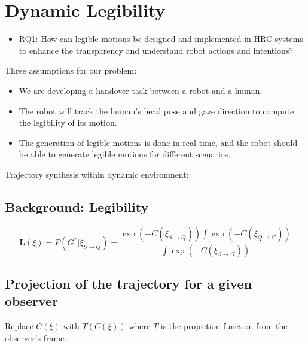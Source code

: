 \section{Dynamic Legibility}

\begin{itemize}
    \item
    RQ1: How can legible motions be designed and implemented in HRC systems to enhance the transparency and understand robot actions and intentions?
\end{itemize}

Three assumptions for our problem:
\begin{itemize}
    \item
    We are developing a handover task between a robot and a human.
    \item
    The robot will track the human's head pose and gaze direction to compute the legibility of its motion.
    \item
    The generation of legible motions is done in real-time, and the robot should be able to generate legible motions for different scenarios.
\end{itemize}


Trajectory synthesis within dynamic environment:

\subsection{Background: Legibility}

\begin{equation}
    \mathbf{L}(\xi) = P(G^* |\xi_{S \rightarrow Q}) =
    \frac{\exp (-C(\xi_{S \rightarrow Q})) \int \exp( -C(\xi_{Q \rightarrow G}))}
         {\int \exp (-C(\xi_{S \rightarrow G}))}
\end{equation}

\subsection{Projection of the trajectory for a given observer}
Replace $C(\xi)$ with $T(C(\xi))$ where $T$ is the projection function from the observer's frame.

